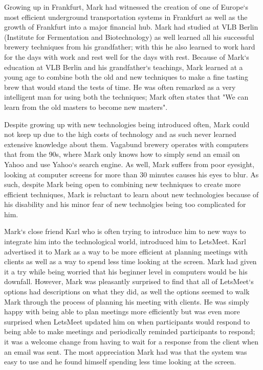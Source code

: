 \documentclass{sigchi}
\begin{document}
Growing up in Frankfurt, Mark had witnessed the creation of one of Europe`s most efficient underground transportation systems in Frankfurt as well as the growth of Frankfurt into a major financial hub. Mark had studied at VLB Berlin (Institute for Fermentation and Biotechnology) as well learned all his successful brewery techniques from his grandfather; with this he also learned to work hard for the days with work and rest well for the days with rest. Because of Mark`s education at VLB Berlin and his grandfather`s teachings, Mark learned at a young age to combine both the old and new techniques to make a fine tasting brew that would stand the tests of time. He was often remarked as a very intelligent man for using both the techniques; Mark often states that "We can learn from the old masters to become new masters".

Despite growing up with new technologies being introduced often, Mark could not keep up due to the high costs of technology and as such never learned extensive knowledge about them. Vagabund brewery operates with computers that from the 90s, where Mark only knows how to simply send an email on Yahoo and use Yahoo`s search engine. As well, Mark suffers from poor eyesight, looking at computer screens for more than 30 minutes causes his eyes to blur. As such, despite Mark being open to combining new techniques to create more efficient techniques, Mark is reluctant to learn about new technologies because of his disability and his minor fear of new technolgies being too complicated for him.

Mark`s close friend Karl who is often trying to introduce him to new ways to integrate him into the technological world, introduced him to LetsMeet. Karl advertised it to Mark as a way to be more efficient at planning meetings with clients as well as a way to spend less time looking at the screen. Mark had given it a try while being worried that his beginner level in computers would be his downfall. However, Mark was pleasantly surprised to find that all of LetsMeet`s options had descriptions on what they did, as well the options seemed to walk Mark through the process of planning his meeting with clients. He was simply happy with being able to plan meetings more efficiently but was even more surprised when LetsMeet updated him on when participants would respond to being able to make meetings and periodically reminded participants to respond; it was a welcome change from having to wait for a response from the client when an email was sent. The most appreciation Mark had was that the system was easy to use and he found himself spending less time looking at the screen.
\end{document}
